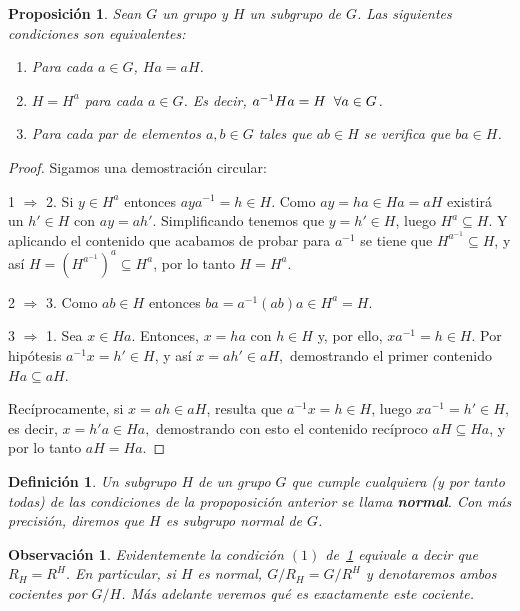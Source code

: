 \documentclass[12pt]{article}
\newtheorem{proposition}[theorem]{Proposición}
\newtheorem{definition}[theorem]{Definición}
\newtheorem{observation}{Observación}[theorem]
\begin{document}
\begin{proposition}\label{prop:gruNo} Sean $G$ un grupo y $H$ un subgrupo de $G$. Las siguientes condiciones son equivalentes:
\begin{enumerate}
\item Para cada $a \in G$, $Ha = aH$.
\item $H = H^{a}$ para cada $a \in G$. Es decir, $a^{-1}Ha = H \hspace{0.2cm} \forall a\in G$.
\item Para cada par de elementos $a,b \in G$ tales que $ab \in H$ se verifica que $ba \in H$.
\end{enumerate}
\end{proposition}
\begin{proof}Sigamos una demostración circular:

1 $\Rightarrow$ 2. Si $y \in H^{a}$ entonces $aya^{-1} = h \in H$. Como $ay = ha \in Ha = aH$ existirá un $h' \in H$ con $ay = ah'$. Simplificando tenemos que $y = h' \in H$, luego $H^{a}\subseteq H$. Y aplicando el contenido que acabamos de probar para $a^{-1}$ se tiene que $H^{a^{-1}}\subseteq H$, y así $H = (H^{a^{-1}})^{a}\subseteq H^{a}$, por lo tanto $H = H^{a}$.

2 $\Rightarrow$ 3. Como $ab \in H$ entonces $ba = a^{-1}(ab)a \in H^{a} = H.$

3 $\Rightarrow$ 1. Sea $x \in Ha$. Entonces, $x = ha$ con $h \in H$ y, por ello, $xa^{-1} = h \in H.$ Por hipótesis $a^{-1}x = h' \in H$, y así $x = ah'\in aH,$ demostrando el primer contenido $Ha \subseteq aH$.

Recíprocamente, si $x = ah \in aH$, resulta que $a^{-1}x = h \in H$, luego $xa^{-1} = h' \in H$, es decir, $x = h'a \in Ha,$ demostrando con esto el contenido recíproco $aH \subseteq Ha$, y por lo tanto $aH = Ha$.

\end{proof}

\begin{definition}Un subgrupo $H$ de un grupo $G$ que cumple cualquiera (y por tanto todas) de las condiciones de la propoposición anterior se llama \textbf{normal}. Con más precisión, diremos que $H$ es subgrupo normal de $G$.
\end{definition}

\begin{observation}Evidentemente la condición $(1)$ de~\ref{prop:gruNo} equivale a decir que $R_H = R^H$. En particular, si $H$ es normal, $G/R_H = G/R^H$ y denotaremos ambos cocientes por $G/H$. Más adelante veremos qué es exactamente este cociente.
\end{observation}
\end{document}
